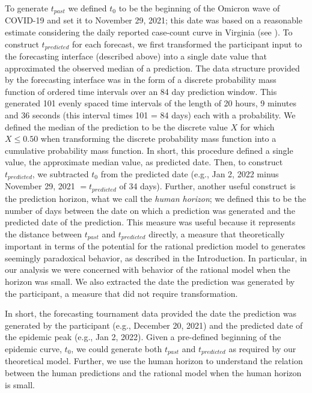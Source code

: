 \documentclass[a4paper,man,natbib]{apa6}
\begin{document}
To generate $t_{past}$ we defined $t_0$ to be the beginning of the Omicron wave of COVID-19 and set it to November 29, 2021; this date was based on a reasonable estimate considering the daily reported case-count curve in Virginia (see \cite{VDHOnline}).  To construct $t_{predicted}$ for each forecast, we first transformed the participant input to the forecasting interface (described above) into a single date value that approximated the observed median of a prediction.  The data structure provided by the forecasting interface was in the form of a discrete probability mass function of ordered time intervals over an 84 day prediction window.  This generated 101 evenly spaced time intervals of the length of 20 hours, 9 minutes and 36 seconds (this interval times 101 = 84 days) each with a probability.  We defined the median of the prediction to be the discrete value $X$ for which $X \le 0.50$ when transforming the discrete probability mass function into a cumulative probability mass function.  In short, this procedure defined a single value, the approximate median value, as predicted date. Then, to construct $t_{predicted}$, we subtracted $t_0$ from the predicted date (e.g., Jan 2, 2022 minus November 29, 2021 $= t_{predicted}$ of 34 days).  Further, another useful construct is the prediction horizon, what we call the \textit{human horizon}; we defined this to be the number of days between the date on which a prediction was generated and the predicted date of the prediction.  This measure was useful because it represents the distance between $t_{past}$ and $t_{predicted}$ directly, a measure that theoretically important in terms of the potential for the rational prediction model to generates seemingly paradoxical behavior, as described in the Introduction.  In particular, in our analysis we were concerned with behavior of the rational model when the horizon was small.  We also extracted the date the prediction was generated by the participant, a measure that did not require transformation.

In short, the forecasting tournament data provided the date the prediction was generated by the participant (e.g., December 20, 2021) and the predicted date of the epidemic peak (e.g., Jan 2, 2022). Given a pre-defined beginning of the epidemic curve, $t_0$, we could generate both $t_{past}$ and $t_{predicted}$ as required by our theoretical model.  Further, we use the human horizon to understand the relation between the human predictions and the rational model when the human horizon is small.
\end{document}
